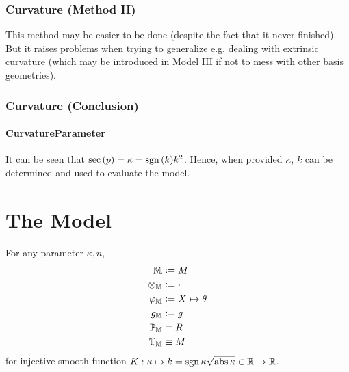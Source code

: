 \documentclass[stu, babel, american, biblatex, a4paper, draftall]{apa7}
\begin{document}
\subsubsection{Curvature (Method II)}
This method may be easier to be done
(despite the fact that it never finished).
But it raises problems when trying to generalize e.g. dealing with extrinsic curvature
(which may be introduced in Model III
if not to mess with other basis geometries).
\begin{lemma}\label{Model:ChristoffelSymbol}

\end{lemma}
\begin{lemma}\label{Model:RiemannCurvatureTensor}

\end{lemma}
\subsubsection{Curvature (Conclusion)}
\begin{lemma}\label{Model:SectionalCurvature}

\end{lemma}
\paragraph{CurvatureParameter}
It can be seen that $\operatorname{sec}\left(p\right) = \kappa = \operatorname{sgn}{\left(k\right)}k^2$.
Hence, when provided $\kappa$, $k$ can be determined and used to evaluate the model.
\section{The Model}
\begin{ModelGroupElement}
    For any parameter $\kappa, n$,
    \begin{align*}
        \elements                   & \defeq M                                    \\
        \groupoperation{\elements}  & \defeq \cdot                                \\
        \charts{\elements}          & \defeq \tensor{X}{}\mapsto\tensor{\theta}{} \\
        \innerprod{\elements}       & \defeq g                                    \\
        \points{\elements}          & \equiv R                                    \\
        \transformations{\elements} & \equiv M                                    \\
    \end{align*}
    for injective smooth function $K:\kappa \mapsto k = \operatorname{sgn}{\kappa}\sqrt{\operatorname{abs}{\kappa}}\in\mathbb{R}\to\mathbb{R}$.
\end{ModelGroupElement}
\begin{ModelGroupAssertion}
\end{ModelGroupAssertion}
\begin{ModelCurvatureAssertion}
\end{ModelCurvatureAssertion}
\end{document}
